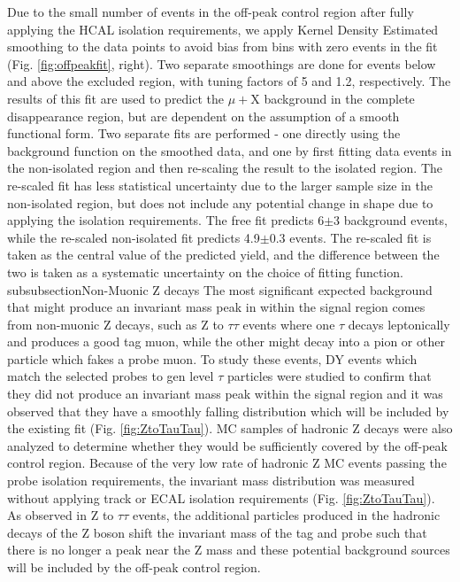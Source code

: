 Due to the small number of events in the off-peak control region after fully applying the HCAL isolation requirements, we apply Kernel Density Estimated smoothing to the data points to avoid bias from bins with zero events in the fit (Fig. \ref{fig:offpeakfit}, right). Two separate smoothings are done for events below and above the excluded region, with tuning factors of 5 and 1.2, respectively. The results of this fit are used to predict the $\mu+$X background in the complete disappearance region, but are dependent on the assumption of a smooth functional form. Two separate fits are performed - one directly using the background function on the smoothed data, and one by first fitting data events in the non-isolated region and then re-scaling the result to the isolated region. The re-scaled fit has less statistical uncertainty due to the larger sample size in the non-isolated region, but does not include any potential change in shape due to applying the isolation requirements. The free fit predicts 6$\pm$3 background events, while the re-scaled non-isolated fit predicts 4.9$\pm$0.3 events. The re-scaled fit is taken as the central value of the predicted yield, and the difference between the two is taken as a systematic uncertainty on the choice of fitting function.
subsubsection{Non-Muonic Z decays}
The most significant expected background that might produce an invariant mass peak in within the signal region comes from non-muonic Z decays, such as Z to $\tau\tau$ events where one $\tau$ decays leptonically and produces a good tag muon, while the other might decay into a pion or other particle which fakes a probe muon. To study these events, DY events which match the selected probes to gen level $\tau$ particles were studied to confirm that they did not produce an invariant mass peak within the signal region and it was observed that they have a smoothly falling distribution which will be included by the existing fit (Fig. \ref{fig:ZtoTauTau}).
MC samples of hadronic Z decays were also analyzed to determine whether they would be sufficiently covered by the off-peak control region. Because of the very low rate of hadronic Z MC events passing the probe isolation requirements, the invariant mass distribution was measured without applying track or ECAL isolation requirements (Fig. \ref{fig:ZtoTauTau}). As observed in Z to $\tau\tau$ events, the additional particles produced in the hadronic decays of the Z boson shift the invariant mass of the tag and probe such that there is no longer a peak near the Z mass and these potential background sources will be included by the off-peak control region.


